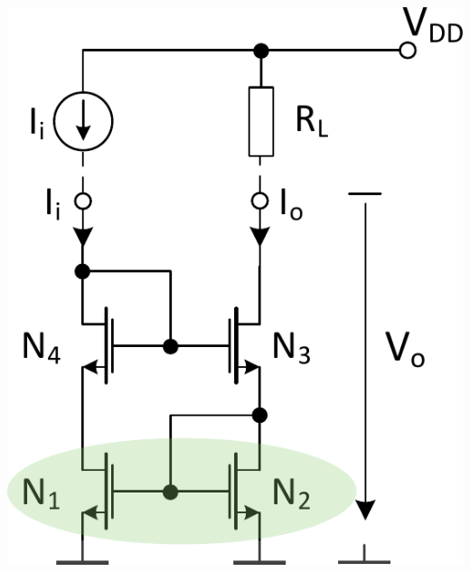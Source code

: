 \begin{minipage}[t]{0.35\columnwidth}
    \begin{center}
        \textbf{}

        \includegraphics[width=\columnwidth, align=t]{images/06_stormspiegel_wilson_verbessert.pdf}
    \end{center}
\end{minipage}
\hfill
